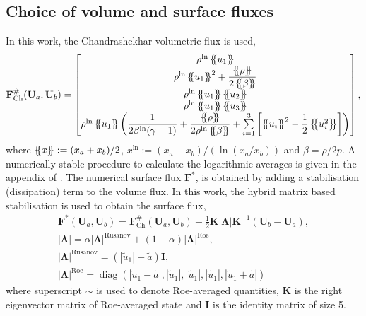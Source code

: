 \documentclass[a4paper,11pt,oneside]{article}
\newcommand{\vect}[1]{\ensuremath{\boldsymbol{\mathbf{#1}}}} %
\newcommand{\abs}[1]{\ensuremath{\left\lvert#1\right\rvert}} %
\DeclareMathOperator{\diag}{diag} %
\newcommand{\defeq}{\ensuremath{:=}} %
\newcommand{\avg}[1]{\ensuremath{\left\{ \mskip-5mu \left\{ #1 \right\} \mskip-5mu \right\}}} %
\newcommand{\textch}{\text{Ch}} %
\newcommand{\textln}{\text{ln}} %
\newcommand{\eulerref}[1]{\ensuremath{#1}} %
\begin{document}
\subsection{Choice of volume and surface fluxes}
\label{subsec:vol_surf_flux}
In this work, the Chandrashekhar volumetric flux \cite{gassnerWintersKopriva2016,chandrashekar2013} is used,
\begin{equation*}
	\vect{\eulerref{F}}^\#_\textch(\vect{\eulerref{U}}_a, \vect{\eulerref{U}}_b) =
	\begin{bmatrix}
		\rho^\textln \avg{u_1} \\
		\rho^\textln \avg{u_1}^2 + \dfrac{\avg{\rho}}{2\avg{\beta}} \\
		\rho^\textln \avg{u_1} \avg{u_2} \\
		\rho^\textln \avg{u_1} \avg{u_3} \\
		\rho^\textln \avg{u_1} \left( \dfrac{1}{2\beta^\textln (\gamma-1)} + \dfrac{\avg{\rho}}{2\rho^\textln \avg{\beta}} + \sum\limits_{i=1}^{3} \left[ \avg{u_i}^2 - \dfrac{1}{2} \avg{u_i^2} \right] \right)
	\end{bmatrix},
	\label{eq:1d_chandrashekhar_volume_flux}
\end{equation*}
where $\avg{x} \defeq (x_a + x_b)/2$, $x^\textln \defeq (x_a - x_b)/(\ln (x_a/x_b))$ and $\beta = \rho/2p$. A numerically stable procedure to calculate the logarithmic averages is given in the appendix of \cite{ismailRoe2009}. The numerical surface flux $\vect{\eulerref{F}}^*$, is obtained by adding a stabilisation (dissipation) term to the volume flux. In this work, the hybrid matrix based stabilisation \cite{chandrashekar2013} is used to obtain the surface flux,
\begin{gather}
	\vect{\eulerref{F}}^*(\vect{\eulerref{U}}_a, \vect{\eulerref{U}}_b) = \vect{\eulerref{F}}^\#_\textch(\vect{\eulerref{U}}_a, \vect{\eulerref{U}}_b) - \frac{1}{2} \vect{K} \abs{\vect{\Lambda}} \vect{K}^{-1} \left( \vect{\eulerref{U}}_b - \vect{\eulerref{U}}_a \right),\\
	\abs{\vect{\Lambda}} = \alpha \abs{\vect{\Lambda}}^\text{Rusanov} + (1-\alpha) \abs{\vect{\Lambda}}^\text{Roe},\\
	\abs{\vect{\Lambda}}^\text{Rusanov} = (\abs{\tilde{u}_1} + \tilde{a}) \vect{I},\\
	\abs{\vect{\Lambda}}^\text{Roe} = \diag \left( \abs{\tilde{u}_1 - \tilde{a}}, \abs{\tilde{u}_1}, \abs{\tilde{u}_1}, \abs{\tilde{u}_1}, \abs{\tilde{u}_1 + \tilde{a}} \right)
	\label{eq:1d_chandrashekhar_surface_flux}
\end{gather}
where superscript $\sim$ is used to denote Roe-averaged quantities, $\vect{K}$ is the right eigenvector matrix of Roe-averaged state and $\vect{I}$ is the identity matrix of size 5.
\end{document}
